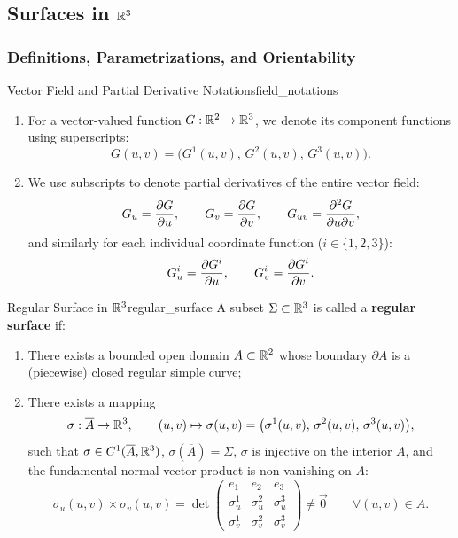 \subsection{Surfaces in $\mathbb{R}^3$}

\subsubsection{Definitions, Parametrizations, and Orientability}

\begin{definition}{Vector Field and Partial Derivative Notations}{field_notations}
\begin{enumerate}[label=\textbf{\alph*)}]
    \item For a vector-valued function $G : \mathbb{R}^2 \to \mathbb{R}^3$, we denote its component functions using superscripts:
    \[
        G(u,v) = \big(G^1(u,v), \, G^2(u,v), \, G^3(u,v)\big).
    \]
    \item We use subscripts to denote partial derivatives of the entire vector field:
    \[
        G_u = \pdv{G}{u}, \qquad G_v = \pdv{G}{v}, \qquad G_{uv} = \frac{\partial^2 G}{\partial u \partial v},
    \]
    and similarly for each individual coordinate function ($i \in \{1, 2, 3\}$):
    \[
        G^i_u = \pdv{G^i}{u}, \qquad G^i_v = \pdv{G^i}{v}.
    \]
\end{enumerate}
\end{definition}

\begin{definition}{Regular Surface in $\mathbb{R}^3$}{regular_surface}
A subset $\Sigma \subset \mathbb{R}^3$ is called a \textbf{regular surface} if:
\begin{enumerate}[label=\textbf{\alph*)}]
    \item There exists a bounded open domain $A \subset \mathbb{R}^2$ whose boundary $\partial A$ is a (piecewise) closed regular simple curve;
    \item There exists a mapping
    \[
        \sigma : \overline{A} \to \mathbb{R}^3, \qquad (u,v) \mapsto \sigma(u,v) = \big(\sigma^1(u,v), \, \sigma^2(u,v), \, \sigma^3(u,v)\big),
    \]
    such that $\sigma \in C^1(\overline{A}, \mathbb{R}^3)$, $\sigma(\overline{A}) = \Sigma$, $\sigma$ is injective on the interior $A$, and the fundamental normal vector product is non-vanishing on $A$:
    \[
        \sigma_u(u,v) \times \sigma_v(u,v) = \det \begin{pmatrix}
            e_1 & e_2 & e_3 \\
            \sigma^1_u & \sigma^2_u & \sigma^3_u \\
            \sigma^1_v & \sigma^2_v & \sigma^3_v
        \end{pmatrix} \neq \vec{0} \qquad \forall (u,v) \in A.
    \]
\end{enumerate}
\end{definition}

